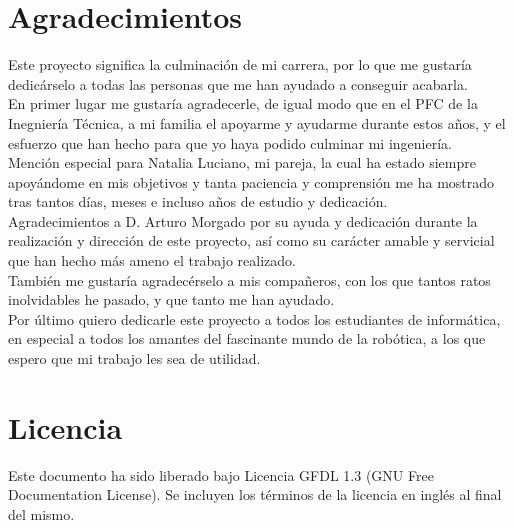 

\section{Agradecimientos}

Este proyecto significa la culminación de mi carrera, por lo que me gustaría dedicárselo a todas las personas que me han ayudado a conseguir acabarla.\\

En primer lugar me gustaría agradecerle, de igual modo que en el PFC de la Inegniería Técnica, a mi familia el apoyarme y ayudarme durante estos años, y el esfuerzo que han hecho para que yo haya podido culminar mi ingeniería.\\

Mención especial para Natalia Luciano, mi pareja, la cual ha estado siempre apoyándome en mis objetivos y tanta paciencia y comprensión me ha mostrado tras tantos días, meses e incluso años de estudio y dedicación.\\ 

Agradecimientos a D. Arturo Morgado por su ayuda y dedicación durante la realización y dirección de este proyecto, así como su carácter amable y servicial que han hecho más ameno el trabajo realizado.\\

También me gustaría agradecérselo a mis compañeros, con los que tantos ratos inolvidables he pasado, y que tanto me han ayudado.\\

Por último quiero dedicarle este proyecto a todos los estudiantes de informática, en especial a todos los amantes del fascinante mundo de la robótica, a los que espero que mi trabajo les sea de utilidad.\\

\cleardoublepage

\section{Licencia}

\bigskip
\bigskip

Este documento ha sido liberado bajo Licencia GFDL 1.3 (GNU Free Documentation License). Se incluyen los términos de la licencia en inglés al final del mismo.\\

